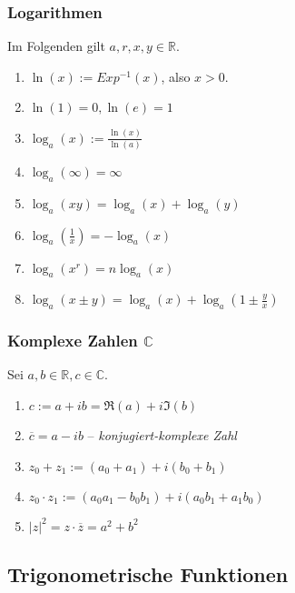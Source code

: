 \documentclass[a4paper, 9pt, DIV=24]{scrartcl}
\begin{document}
\subsubsection{Logarithmen} Im Folgenden gilt $a,r,x,y \in\mathbb{R}$.
\begin{enumerate}[label={(}\arabic*{)}]
 \item $\ln(x) := Exp^{-1}(x)$, also $x > 0$.
 \item $\ln(1) = 0, \ln(e) = 1$
 \item $\log_a(x) := \frac{\ln(x)}{\ln(a)}$
 \item $\log_a(\infty) = \infty$
 \item $\log_a(xy) = \log_a(x)+\log_a(y)$
 \item $\log_a(\frac{1}{x}) = -\log_a(x)$
 \item $\log_a(x^r) = n\log_a(x)$
 \item $\log_a(x \pm y) = \log_a(x) + \log_a(1 \pm \frac{y}{x})$
\end{enumerate}

\subsubsection{Komplexe Zahlen $\mathbb{C}$}
Sei $a,b \in \mathbb{R}, c \in \mathbb{C}$.
\begin{enumerate}[label={(}\arabic*{)}]
 \item $c := a + ib = \Re(a) + i\Im(b)$
 \item $\overline{c} = a - ib$ -- \emph{konjugiert-komplexe Zahl}
 \item $z_0 + z_1 := (a_0 + a_1) + i(b_0 + b_1)$
 \item $z_0 \cdot z_1 := (a_0a_1 - b_0b_1) + i(a_0b_1 + a_1b_0)$
 \item $|z|^2 = z\cdot\overline{z} = a^2 + b^2$
\end{enumerate}


\subsection{Trigonometrische Funktionen}
\end{document}
